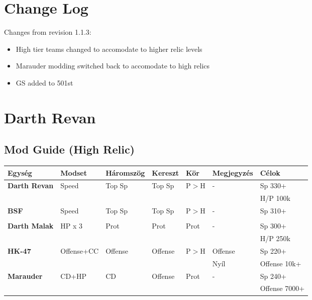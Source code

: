 \documentclass[11pt]{report}
\begin{document}

\chapter{Change Log}
Changes from revision 1.1.3:
\begin{itemize}
    \item High tier teams changed to accomodate to higher relic levels
    \item Marauder modding switched back to accomodate to high relics
    \item GS added to 501st
\end{itemize}


\chapter{Darth Revan}
\section{Mod Guide (High Relic)}
\begin{center}
    \begin{tabular}{|l | l | l | l | l | l | l |}
        \hline
        Egység & Modset & Háromszög & Kereszt & Kör & Megjegyzés & Célok\\ \hline
        \textbf{Darth Revan} & Speed & Top Sp & Top Sp & P$>$H & - & Sp 330+\\ 
        &  &  &  &  &  & H/P 100k\\ \hline
        \textbf{BSF} & Speed & Top Sp & Top Sp & P$>$H & - & Sp 310+\\
        &  &  &  &  &  & \\ \hline
        \textbf{Darth Malak} & HP x 3 & Prot & Prot & Prot & - & Sp 300+\\
        &  &  &  &  &  & H/P 250k\\ \hline
        \textbf{HK-47} & Offense+CC & Offense & Offense & P$>$H & Offense  & Sp 220+\\
        &  &  &  &  & Nyíl & Offense 10k+\\ \hline
        \textbf{Marauder} & CD+HP & CD & Offense & Prot & - & Sp 240+\\
        &  &  &  &  &  & Offense 7000+\\ \hline
    \end{tabular}
\end{center}
\end{document}

